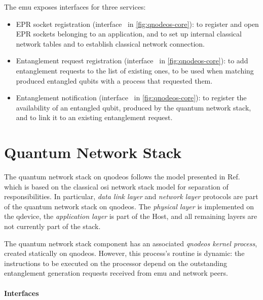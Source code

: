 The \acrshort{emu} exposes interfaces for three services:
\begin{itemize}
    \item EPR socket registration (interface~ in \cref{fig:qnodeos-core}): to register
          and open EPR sockets belonging to an application, and to set up internal classical network
          tables and to establish classical network connection.
    \item Entanglement request registration (interface~ in \cref{fig:qnodeos-core}): to
          add entanglement requests to the list of existing ones, to be used when matching produced
          entangled qubits with a process that requested them.
    \item Entanglement notification (interface~ in \cref{fig:qnodeos-core}): to register
          the availability of an entangled qubit, produced by the quantum network stack, and to link
          it to an existing entanglement request.
\end{itemize}

\section{Quantum Network Stack}

The quantum network stack on \acrshort{qnodeos} follows the model presented in
Ref.~\cite{dahlberg_2019_egp} which is based on the classical \acrshort{osi} network stack model for
separation of responsibilities. In particular, \emph{data link layer} and \emph{network layer}
protocols are part of the quantum network stack on \acrshort{qnodeos}. The \emph{physical layer} is
implemented on the \acrshort{qdevice}, the \emph{application layer} is part of the Host, and all
remaining layers are not currently part of the stack.

The quantum network stack component has an associated \emph{\acrshort{qnodeos} kernel process},
created statically on \acrshort{qnodeos}. However, this process's routine is dynamic: the
instructions to be executed on the processor depend on the outstanding entanglement generation
requests received from \acrshort{emu} and network peers.

\paragraph{Interfaces}

